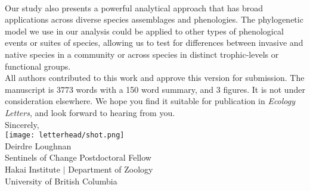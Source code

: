 \documentclass[11pt,a4paper]{article}
\begin{document}
\vspace{1.5ex}\\
Our study also presents a powerful analytical approach that has broad applications across diverse species assemblages and phenologies. The phylogenetic model we use in our analysis could be applied to other types of phenological events or suites of species, allowing us to test for differences between invasive and native species in a community or across  species in distinct trophic-levels or functional groups.
\vspace{1.5ex}\\
\noindent All authors contributed to this work and approve this version for submission. The manuscript is 3773 words with a 150 word summary, and 3 figures. It is not under consideration elsewhere. We hope you find it suitable for publication in \emph{Ecology Letters}, and look forward to hearing from you. 
\vspace{1.5ex}\\
\noindent Sincerely, \\
\texttt{[image: letterhead/shot.png]} \\ 
\noindent Deirdre Loughnan\\
\noindent Sentinels of Change Postdoctoral Fellow\\
\noindent Hakai Institute $|$ Department of Zoology\\
\noindent University of British Columbia
\newpage
\vspace{-5ex}
% 


\newpage
\end{document}
